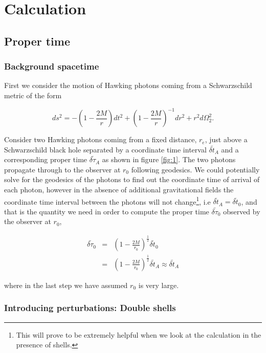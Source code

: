 \documentclass[aps,showpacs,twocolumn,floats,prd,superscriptaddress,nofootinbib]{revtex4-1}
\begin{document}
\section{Calculation}

\subsection{Proper time}

\subsubsection{Background spacetime}


First we consider the motion of Hawking photons coming from a Schwarzschild metric of the form

\begin{equation}
	ds^2 = - \left( 1 - \frac{2M}{r} \right) dt^2 + \left( 1 - \frac{2M}{r} \right)^{-1} dr^2 + r^2 d \Omega_2^2.
\end{equation}

Consider two Hawking photons coming from a fixed distance, $r_{e}$, just above a Schwarzschild black hole separated by a coordinate time interval $\bar{\delta t}_A$ and a corresponding proper time $\bar{\delta \tau}_A$ as shown in figure \ref{fig:1}. The two photons propagate through to the observer at $r_0$ following geodesics. We could potentially solve for the geodesics of the photons to find out the coordinate time of arrival of each photon, however in the absence of additional gravitational fields the coordinate time interval between the photons will not change\footnote{This will prove to be extremely helpful when we look at the calculation in the presence of shells.}, i.e $\bar{\delta t}_A = \bar{\delta t}_0$, and that is the quantity we need in order to compute the proper time $\bar{\delta \tau}_0$ observed by the observer at $r_0$,

\begin{eqnarray}
	\bar{\delta \tau}_0 & = & \left( 1- \frac{2M}{r_0} \right)^\frac{1}{2} \bar{\delta t}_0	\nonumber	\\
	& = & \left( 1 - \frac{2M}{r_0} \right)^\frac{1}{2} \bar{\delta t}_A \approx \bar{\delta t}_{A} 
\end{eqnarray}

where in the last step we have assumed $r_0$ is very large.

\subsubsection{Introducing perturbations: Double shells}
\end{document}
